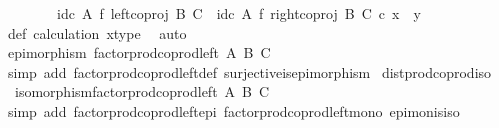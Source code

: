 \begin{isabellebody}
\ \ \ \ \ \ \ \ {\isacharparenleft}{\kern0pt}id\isactrlsub c\ A\ {\isasymtimes}\isactrlsub f\ left{\isacharunderscore}{\kern0pt}coproj\ B\ C{\isacharparenright}{\kern0pt}\ {\isasymamalg}\ {\isacharparenleft}{\kern0pt}id\isactrlsub c\ A\ {\isasymtimes}\isactrlsub f\ right{\isacharunderscore}{\kern0pt}coproj\ B\ C{\isacharparenright}{\kern0pt}\ {\isasymcirc}\isactrlsub c\ x\ {\isacharequal}{\kern0pt}\ y{\isachardoublequoteclose}\isanewline
\ \ \ \ \ \ \ \ \isamarkupfalse%
\ {\isasymphi}{\isacharunderscore}{\kern0pt}def\ calculation\ x{\isacharunderscore}{\kern0pt}type\ \isamarkupfalse%
\ auto\isanewline
\ \ \ \ \isamarkupfalse%
\isanewline
\ \ \isamarkupfalse%
\isanewline
\ \ \isamarkupfalse%
\ \isamarkupfalse%
\ {\isachardoublequoteopen}epimorphism\ {\isacharparenleft}{\kern0pt}factor{\isacharunderscore}{\kern0pt}prod{\isacharunderscore}{\kern0pt}coprod{\isacharunderscore}{\kern0pt}left\ A\ B\ C{\isacharparenright}{\kern0pt}{\isachardoublequoteclose}\isanewline
\ \ \ \ \isamarkupfalse%
\ {\isacharparenleft}{\kern0pt}simp\ add{\isacharcolon}{\kern0pt}\ factor{\isacharunderscore}{\kern0pt}prod{\isacharunderscore}{\kern0pt}coprod{\isacharunderscore}{\kern0pt}left{\isacharunderscore}{\kern0pt}def\ surjective{\isacharunderscore}{\kern0pt}is{\isacharunderscore}{\kern0pt}epimorphism{\isacharparenright}{\kern0pt}\isanewline
{}\isamarkupfalse%
%
\endisatagproof
{\isafoldproof}%
%
\isadelimproof
\isanewline
%
\endisadelimproof
\isanewline
{}\isamarkupfalse%
\ dist{\isacharunderscore}{\kern0pt}prod{\isacharunderscore}{\kern0pt}coprod{\isacharunderscore}{\kern0pt}iso{\isacharcolon}{\kern0pt}\isanewline
\ \ {\isachardoublequoteopen}isomorphism{\isacharparenleft}{\kern0pt}factor{\isacharunderscore}{\kern0pt}prod{\isacharunderscore}{\kern0pt}coprod{\isacharunderscore}{\kern0pt}left\ A\ B\ C{\isacharparenright}{\kern0pt}{\isachardoublequoteclose}\isanewline
%
\isadelimproof
\ \ %
\endisadelimproof
%
\isatagproof
{}\isamarkupfalse%
\ {\isacharparenleft}{\kern0pt}simp\ add{\isacharcolon}{\kern0pt}\ factor{\isacharunderscore}{\kern0pt}prod{\isacharunderscore}{\kern0pt}coprod{\isacharunderscore}{\kern0pt}left{\isacharunderscore}{\kern0pt}epi\ factor{\isacharunderscore}{\kern0pt}prod{\isacharunderscore}{\kern0pt}coprod{\isacharunderscore}{\kern0pt}left{\isacharunderscore}{\kern0pt}mono\ epi{\isacharunderscore}{\kern0pt}mon{\isacharunderscore}{\kern0pt}is{\isacharunderscore}{\kern0pt}iso{\isacharparenright}{\kern0pt}%
\endisatagproof

\end{isabellebody}
